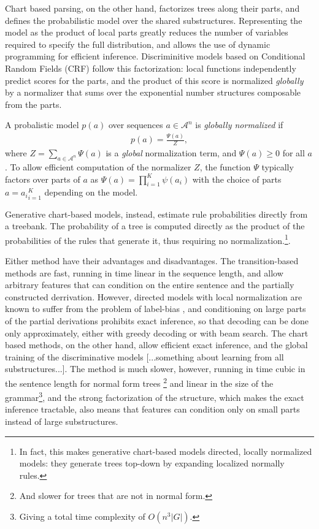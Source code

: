     Chart based parsing, on the other hand, factorizes trees along their parts, and defines the probabilistic model over the shared substructures. Representing the model as the product of local parts greatly reduces the number of variables required to specify the full distribution, and allows the use of dynamic programming for efficient inference. Discriminitive models based on Conditional Random Fields (CRF) \citep{lafferty2001crf} follow this factorization: local functions independently predict scores for the parts, and the product of this score is normalized \textit{globally} by a normalizer that sums over the exponential number structures composable from the parts.
    \begin{definition}{}
      A probalistic model $p(a)$ over sequences $a \in \mathcal{A}^n$ is \textit{globally normalized} if
      \begin{align*}
        p(a) = \frac{ \Psi( a ) }{ Z },
      \end{align*}
      where $Z  = \sum_{a \in \mathcal{A}^n} \Psi( a )$ is a \textit{global} normalization term, and $\Psi( a ) \geq 0$ for all $a$. To allow efficient computation of the normalizer $Z$, the function $\Psi$ typically factors over parts of $a$ as $\Psi ( a ) = \prod_{i=1}^K \psi (a_i )$ with the choice of parts $a = {a_i}_{i=1}^K$ depending on the model.
    \end{definition}
    Generative chart-based models, instead, estimate rule probabilities directly from a treebank. The probability of a tree is computed directly as the product of the probabilities of the rules that generate it, thus requiring no normalization.\footnote{In fact, this makes generative chart-based models directed, locally normalized models: they generate trees top-down by expanding localized normally rules.}.

    Either method have their advantages and disadvantages. The transition-based methods are fast, running in time linear in the sequence length, and allow arbitrary features that can condition on the entire sentence and the partially constructed derrivation. However, directed models with local normalization are known to suffer from the problem of label-bias \citep{lafferty2001crf}, and conditioning on large parts of the partial derivations prohibits exact inference, so that decoding can be done only approximately, either with greedy decoding or with beam search. The chart based methods, on the other hand, allow efficient exact inference, and the global training of the discriminative models [...something about learning from all substructures...]. The method is much slower, however, running in time cubic in the sentence length for normal form trees \footnote{And slower for trees that are not in normal form.} and linear in the size of the grammar\footnote{Giving a total time complexity of $O(n^3|G|)$.}, and the strong factorization of the structure, which makes the exact inference tractable, also means that features can condition only on small parts instead of large substructures.

